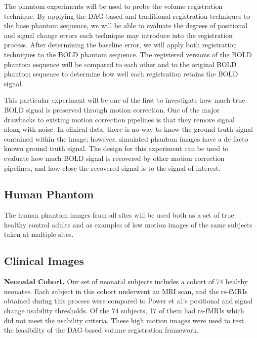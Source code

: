 The phantom experiments will be used to probe the volume registration technique. By applying the DAG-based and traditional registration techniques to the base phantom sequence, we will be able to evaluate the degrees of positional and signal change errors each technique may introduce into the registration process. After determining the baseline error, we will apply both registration techniques to the BOLD phantom sequence. The registered versions of the BOLD phantom sequence will be compared to each other and to the original BOLD phantom sequence to determine how well each registration retains the BOLD signal.

This particular experiment will be one of the first to investigate how much true BOLD signal is preserved through motion correction. One of the major drawbacks to existing motion correction pipelines is that they remove signal along with noise. In clinical data, there is no way to know the ground truth signal contained within the image; however, simulated phantom images have a de facto known ground truth signal. The design for this experiment can be used to evaluate how much BOLD signal is recovered by other motion correction pipelines, and how close the recovered signal is to the signal of interest.

\subsection{Human Phantom}

The human phantom images from all sites will be used both as a set of true healthy control adults and as examples of low motion images of the same subjects taken at multiple sites.

\subsection{Clinical Images}

\textbf{Neonatal Cohort.} Our set of neonatal subjects includes a cohort of 74 healthy neonates. Each subject in this cohort underwent an MRI scan, and the rs-fMRIs obtained during this process were compared to Power et al.'s positional and signal change usability thresholds. Of the 74 subjects, 17 of them had rs-fMRIs which did not meet the usability criteria. These high motion images were used to test the feasibility of the DAG-based volume registration framework. 

